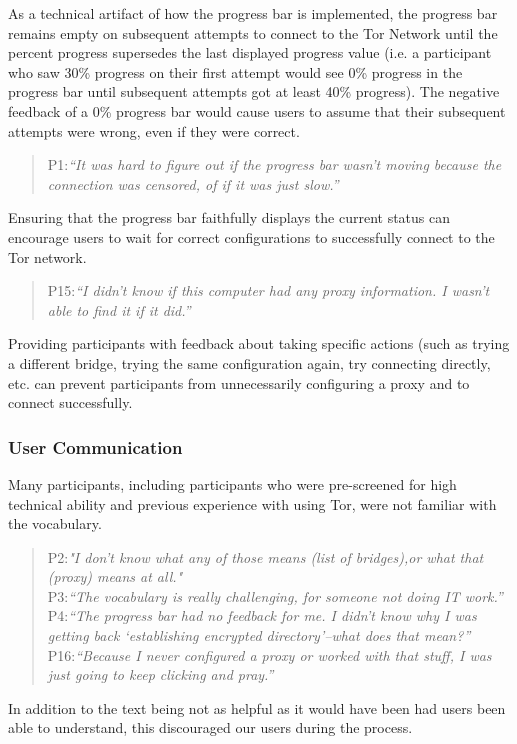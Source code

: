 \documentclass{template}
\begin{document}
As a technical artifact of how the progress bar is implemented, the progress bar remains empty on subsequent attempts to connect to the Tor Network until the percent progress supersedes the last displayed progress value (i.e. a participant who saw 30\% progress on their first attempt would see 0\% progress in the progress bar until subsequent attempts got at least 40\% progress). The negative feedback of a 0\% progress bar would cause users to assume that their subsequent attempts were wrong, even if they were correct. 
\begin{quotation}
\noindent P1:\textit{``It was hard to figure out if the progress bar wasn't moving because the connection was censored, of if it was just slow.''}
\end{quotation}

Ensuring that the progress bar faithfully displays the current status can encourage users to wait for correct configurations to successfully connect to the Tor network. 

\begin{quotation}
\noindent P15:\textit{``I didn't know if this computer had any proxy information. I wasn't able to find it if it did.''}
\end{quotation}

Providing participants with feedback about taking specific actions (such as trying a different bridge, trying the same configuration again, try connecting directly, etc. can prevent participants from unnecessarily configuring a proxy and to connect successfully.\\

\subsubsection{User Communication} 
Many participants, including participants who were pre-screened for high technical ability and previous experience with using Tor, were not familiar with the vocabulary. 
\begin{quotation}
\noindent P2:\textit{"I don't know what any of those means (list of bridges),or what that (proxy)
 means at all."}\\
 
 \noindent P3:\textit{``The vocabulary is really challenging, for someone not doing IT work.''}\\
 
 \noindent P4:\textit{``The progress bar had no feedback for me. I didn't know why I was getting back `establishing encrypted directory'--what does that mean?''}\\
 
 \noindent P16:\textit{``Because I never configured a proxy or worked with that stuff, I was just going to keep clicking and pray.''}
\end{quotation} 
In addition to the text being not as helpful as it would have been had users been able to understand, this discouraged our users during the process.\\
\end{document}
